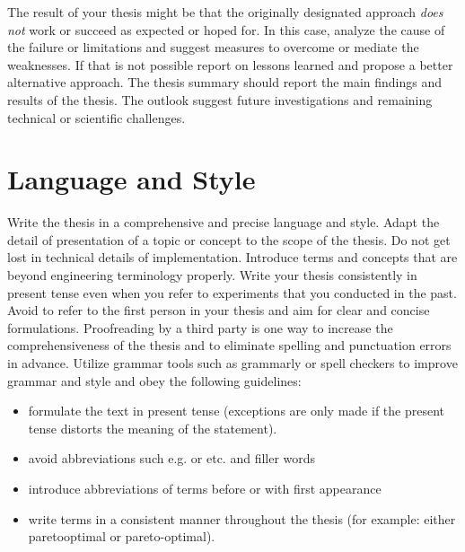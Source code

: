The result of your thesis might be that the originally designated approach  \emph{does not} work or succeed as expected or hoped for.
In this case, analyze the cause of the failure or limitations and suggest measures to overcome or mediate the weaknesses. If that is not possible report on lessons learned and propose a better alternative approach.
The thesis summary should report the main findings and results of the thesis.
The outlook suggest future investigations and remaining technical or scientific challenges.



\section{Language and Style}
\label{hinweise:sprache}

Write the thesis in a comprehensive and precise language and style. 
Adapt the detail of presentation of a topic or concept to the scope of the thesis.
Do not get lost in technical details of implementation.
Introduce terms and concepts that are beyond engineering terminology properly.
Write your thesis consistently in present tense even when you refer to experiments
that you conducted in the past.
Avoid to refer to the first person in your thesis and aim for clear and concise formulations.
Proofreading by a third party is one way to increase the comprehensiveness of the thesis and to eliminate spelling and punctuation errors in advance. Utilize grammar tools such as grammarly or spell checkers to improve grammar and style and obey the following
guidelines:

\begin{itemize}
  \item formulate the text in present tense (exceptions are only made if the present tense distorts the meaning of the statement).
  \item avoid abbreviations such e.g. or etc. and filler words 
    \item introduce abbreviations of terms before or with first appearance
  \item write terms in a consistent manner throughout the thesis (for example: either paretooptimal or pareto-optimal).
\end{itemize}


